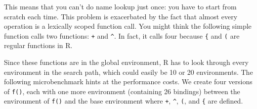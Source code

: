 This means that you can't do name lookup just once: you have to start
from scratch each time. This problem is exacerbated by the fact that
almost every operation is a lexically scoped function call. You might
think the following simple function calls two functions: \texttt{+} and
\texttt{\^{}}. In fact, it calls four because \texttt{\{} and \texttt{(}
are regular functions in R.

\begin{Shaded}
\begin{Highlighting}[]
\StringTok{ }
  \StringTok{ }\StringTok{ }
\NormalTok{\}}
\end{Highlighting}
\end{Shaded}

Since these functions are in the global environment, R has to look
through every environment in the search path, which could easily be 10
or 20 environments. The following microbenchmark hints at the
performance costs. We create four versions of \texttt{f()}, each with
one more environment (containing 26 bindings) between the environment of
\texttt{f()} and the base environment where \texttt{+}, \texttt{\^{}},
\texttt{(}, and \texttt{\{} are defined.


